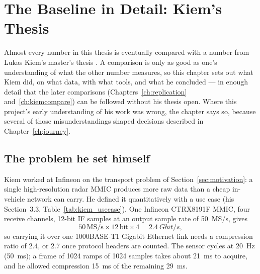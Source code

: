 \chapter{The Baseline in Detail: Kiem's Thesis}
\label{ch:kiem}

Almost every number in this thesis is eventually compared with a number from
Lukas Kiem's master's thesis \cite{kiem2025}. A comparison is only as good as
one's understanding of what the other number measures, so this chapter sets out
what Kiem did, on what data, with what tools, and what he concluded --- in
enough detail that the later comparisons (Chapters~\ref{ch:replication}
and~\ref{ch:kiemcompare}) can be followed without his thesis open. Where
this project's early understanding of his work was wrong, the chapter says so,
because several of those misunderstandings shaped decisions described in
Chapter~\ref{ch:journey}.

\section{The problem he set himself}
\label{sec:kiem_problem}

Kiem worked at Infineon on the transport problem of
Section~\ref{sec:motivation}: a single high-resolution radar MMIC produces more
raw data than a cheap in-vehicle network can carry. He defined it
quantitatively with a use case (his Section~3.3,
Table~\ref{tab:kiem_usecase}). One Infineon CTRX8191F MMIC, four receive
channels, 12-bit IF samples at an output sample rate of \SI{50}{MS/s}, gives
\begin{equation}
50\,\mathrm{MS/s} \times 12\,\mathrm{bit} \times 4 = \SI{2.4}{Gbit/s},
\end{equation}
so carrying it over one 1000BASE-T1 Gigabit Ethernet link needs a compression
ratio of \num{2.4}, or \num{2.7} once protocol headers are counted. The
sensor cycles at \SI{20}{\hertz} (\SI{50}{\milli\second}); a frame of 1024
ramps of 1024 samples takes about \SI{21}{\milli\second} to acquire, and he
allowed compression \SI{15}{\milli\second} of the remaining
\SI{29}{\milli\second}.


